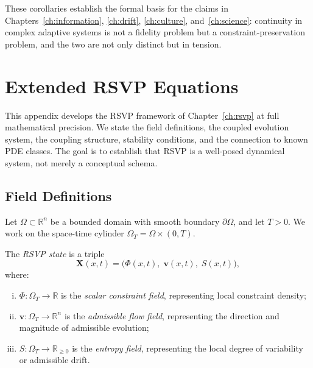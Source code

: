 \documentclass[11pt,openany]{book}
\begin{document}
These corollaries establish the formal basis for the claims
in Chapters~\ref{ch:information}, \ref{ch:drift},
\ref{ch:culture}, and~\ref{ch:science}: continuity in
complex adaptive systems is not a fidelity problem but a
constraint-preservation problem, and the two are not only
distinct but in tension.


\chapter{Extended RSVP Equations}
\label{app:rsvp}

This appendix develops the RSVP framework of
Chapter~\ref{ch:rsvp} at full mathematical precision.  We
state the field definitions, the coupled evolution system,
the coupling structure, stability conditions, and the
connection to known PDE classes.  The goal is to establish
that RSVP is a well-posed dynamical system, not merely a
conceptual schema.

\section{Field Definitions}
\label{sec:rsvp-fields}

Let $\Omega \subset \mathbb{R}^n$ be a bounded domain with
smooth boundary $\partial\Omega$, and let $T > 0$.  We
work on the space-time cylinder $\Omega_T = \Omega \times
(0,T)$.

\begin{definition}
The \emph{RSVP state} is a triple
\[
  \mathbf{X}(x,t) = \bigl(\Phi(x,t),\;
    \boldsymbol{v}(x,t),\; S(x,t)\bigr),
\]
where:
\begin{enumerate}[(i)]
  \item $\Phi : \Omega_T \to \mathbb{R}$ is the
    \emph{scalar constraint field}, representing local
    constraint density;
  \item $\boldsymbol{v} : \Omega_T \to \mathbb{R}^n$ is
    the \emph{admissible flow field}, representing the
    direction and magnitude of admissible evolution;
  \item $S : \Omega_T \to \mathbb{R}_{\ge 0}$ is the
    \emph{entropy field}, representing the local degree of
    variability or admissible drift.
\end{enumerate}
\end{definition}
\end{document}
